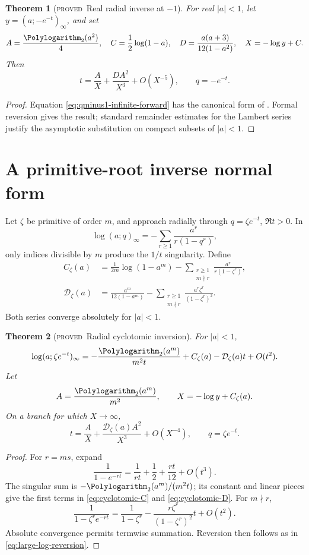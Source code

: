 \documentclass[11pt,letterpaper,oneside,openany]{book}
\newtheorem{theorem}{Theorem}[chapter]
\theoremstyle{definition}
\theoremstyle{remark}
\newcommand{\statusproved}{\textcolor{provedgreen}{\textsc{proved}}}
\newcommand{\Dcal}{\mathcal D}
\begin{document}
\begin{theorem}[\statusproved\ Real radial inverse at \(-1\)]
For real \(|a|<1\), let \(y=(a;-e^{-t})_\infty\), and set
\[
 A=\frac{\Polylogarithm_2(a^2)}4,
 \quad C=\frac12\log(1-a),
 \quad D=\frac{a(a+3)}{12(1-a^2)},
 \quad X=-\log y+C.
\]
Then
\begin{equation}\label{eq:qminus1-infinite-inverse}
 t=\frac{A}{X}+\frac{DA^2}{X^3}+O(X^{-5}),
 \qquad q=-e^{-t}.
\end{equation}
\end{theorem}
\begin{proof}
Equation \eqref{eq:qminus1-infinite-forward} has the canonical form of
.  Formal reversion gives the result; standard
remainder estimates for the Lambert series justify the asymptotic substitution
on compact subsets of \(|a|<1\).
\end{proof}

\section{A primitive-root inverse normal form}
Let \(\zeta\) be primitive of order \(m\), and approach radially through
\(q=\zeta e^{-t}\), \(\Re t>0\).  In
\[
 \log(a;q)_\infty=-\sum_{r\ge1}\frac{a^r}{r(1-q^r)},
\]
only indices divisible by \(m\) produce the \(1/t\) singularity.  Define
\begin{align}
 C_\zeta(a)
 &=\frac1{2m}\log(1-a^m)
 -\sum_{\substack{r\ge1\\m\nmid r}}
 \frac{a^r}{r(1-\zeta^r)},
 \label{eq:cyclotomic-C}\\
 \Dcal_\zeta(a)
 &=\frac{a^m}{12(1-a^m)}
 -\sum_{\substack{r\ge1\\m\nmid r}}
 \frac{a^r\zeta^r}{(1-\zeta^r)^2}.
 \label{eq:cyclotomic-D}
\end{align}
Both series converge absolutely for \(|a|<1\).

\begin{theorem}[\statusproved\ Radial cyclotomic inversion]
For \(|a|<1\),
\begin{equation}\label{eq:cyclotomic-forward}
 \log(a;\zeta e^{-t})_\infty
 =-\frac{\Polylogarithm_2(a^m)}{m^2t}+C_\zeta(a)-\Dcal_\zeta(a)t+O(t^2).
\end{equation}
Let
\[
 A=\frac{\Polylogarithm_2(a^m)}{m^2},
 \qquad X=-\log y+C_\zeta(a).
\]
On a branch for which \(X\to\infty\),
\begin{equation}\label{eq:cyclotomic-inverse}
 t=\frac{A}{X}+\frac{\Dcal_\zeta(a)A^2}{X^3}+O(X^{-4}),
 \qquad q=\zeta e^{-t}.
\end{equation}
\end{theorem}
\begin{proof}
For \(r=ms\), expand
\[
 \frac1{1-e^{-rt}}=\frac1{rt}+\frac12+\frac{rt}{12}+O(t^3).
\]
The singular sum is
\(-\Polylogarithm_2(a^m)/(m^2t)\); its constant and linear pieces give the first terms in
\eqref{eq:cyclotomic-C} and \eqref{eq:cyclotomic-D}.  For \(m\nmid r\),
\[
 \frac1{1-\zeta^re^{-rt}}
 =\frac1{1-\zeta^r}-\frac{r\zeta^r}{(1-\zeta^r)^2}t+O(t^2).
\]
Absolute convergence permits termwise summation.  Reversion then follows as in
\eqref{eq:large-log-reversion}.
\end{proof}
\end{document}
